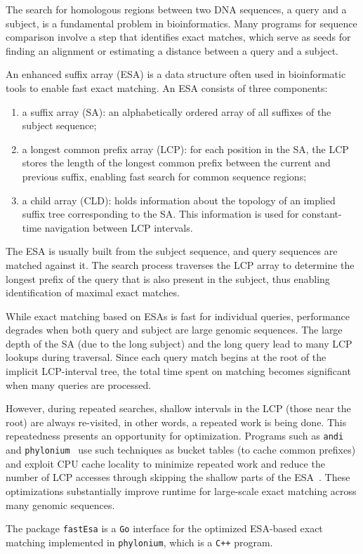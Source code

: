 The search for homologous regions between two DNA sequences, a query
and a subject, is a fundamental problem in bioinformatics. Many
programs for sequence comparison involve a step that identifies exact
matches, which serve as seeds for finding an alignment or estimating a
distance between a query and a subject.

An enhanced suffix array (ESA) is a data structure often used in
bioinformatic tools to enable fast exact matching. An ESA consists of
three components:

\begin{enumerate}
    \itemsep0em \item a suffix array (SA): an alphabetically ordered
    array of all suffixes of the subject sequence;
    
    \item a longest common prefix array (LCP): for each position in
    the SA, the LCP stores the length of the longest common
    prefix between the current and previous suffix, enabling fast
    search for common sequence regions;

    \item a child array (CLD): holds information about the topology of
    an implied suffix tree corresponding to the SA. This information
    is used for constant-time navigation between LCP intervals.
\end{enumerate}

The ESA is usually built from the subject sequence, and query
sequences are matched against it. The search process traverses the LCP
array to determine the longest prefix of the query that is also
present in the subject, thus enabling identification of maximal exact
matches.

While exact matching based on ESAs is fast for individual queries,
performance degrades when both query and subject are large genomic
sequences. The large depth of the SA (due to the long subject) and the
long query lead to many LCP lookups during traversal. Since each query
match begins at the root of the implicit LCP-interval tree, the total
time spent on matching becomes significant when many queries are
processed.

However, during repeated searches, shallow intervals in the LCP (those
near the root) are always re-visited, in other words, a repeated work
is being done. This repeatedness presents an opportunity for
optimization. Programs such as \texttt{andi}~\cite{hau15:andi} and
\texttt{phylonium}~\cite{kloe19:phy} use such techniques as bucket
tables (to cache common prefixes) and exploit CPU cache locality to
minimize repeated work and reduce the number of LCP accesses through
skipping the shallow parts of the ESA~\cite{kloe20:thesis}. These
optimizations substantially improve runtime for large-scale exact
matching across many genomic sequences.

The package \texttt{fastEsa} is a \texttt{Go} interface for the
optimized ESA-based exact matching implemented in \texttt{phylonium},
which is a \texttt{C++} program.
